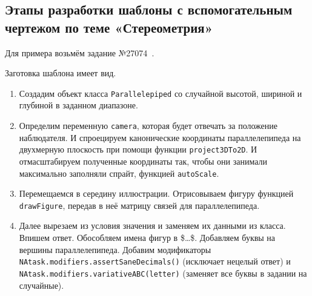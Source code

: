 \subsection{Этапы разработки шаблоны с вспомогательным чертежом по теме «Стереометрия»}

Для примера возьмём задание №27074~\cite{sdamgia}.


Заготовка шаблона имеет вид.



\begin{enumerate}
	\item Создадим объект класса \texttt{Parallelepiped} со случайной высотой, шириной и глубиной в заданном диапазоне. 
	
	\item Определим переменную \texttt{camera}, которая будет отвечать за положение наблюдателя. И спроецируем канонические координаты параллелепипеда на двухмерную плоскость при помощи функции \texttt{project3DTo2D}. И отмасштабируем полученные координаты так, чтобы они занимали максимально заполняли спрайт, функцией \texttt{autoScale}.
	
	\item Перемещаемся в середину иллюстрации. Отрисовываем фигуру функцией \texttt{drawFigure}, передав в неё матрицу связей для параллелепипеда. 
	
	\item Далее вырезаем из условия значения и заменяем их данными из класса. Впишем ответ. Обособляем имена фигур в \$\dots\$. Добавляем буквы на вершины параллелепипеда. Добавим модификаторы          \texttt{NAtask.modifiers.assertSaneDecimals()} (исключает нецелый ответ) и
	\texttt{NAtask.modifiers.variativeABC(letter)} (заменяет все буквы в задании на случайные).
	
\end{enumerate}
